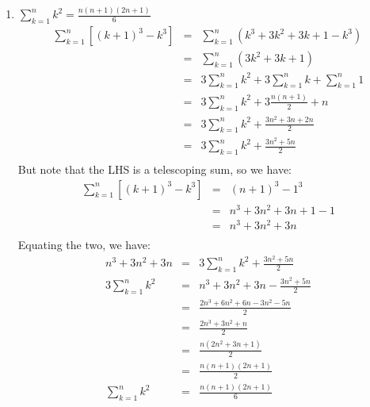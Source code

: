 \documentclass[letterpaper,12pt,fleqn]{article}
\begin{document}
\begin{theproof}
\begin{enumerate}
\item $\sum_{k=1}^nk^2=\frac{n(n+1)(2n+1)}{6}$
\begin{eqnarray*}
\sum_{k=1}^n[(k+1)^3-k^3] &=& \sum_{k=1}^n(k^3+3k^2+3k+1-k^3) \\
    &=& \sum_{k=1}^n(3k^2+3k+1) \\
    &=& 3\sum_{k=1}^nk^2+3\sum_{k=1}^nk+\sum_{k=1}^n1 \\
    &=& 3\sum_{k=1}^nk^2+3\frac{n(n+1)}{2}+n \\
    &=& 3\sum_{k=1}^nk^2+\frac{3n^2+3n+2n}{2} \\
    &=& 3\sum_{k=1}^nk^2+\frac{3n^2+5n}{2} \\
\end{eqnarray*}
But note that the LHS is a telescoping sum, so we have:
\begin{eqnarray*}
\sum_{k=1}^n[(k+1)^3-k^3] &=& (n+1)^3-1^3 \\
    &=& n^3+3n^2+3n+1-1 \\
    &=& n^3+3n^2+3n \\
\end{eqnarray*}
Equating the two, we have:
\begin{eqnarray*}
n^3+3n^2+3n &=& 3\sum_{k=1}^nk^2+\frac{3n^2+5n}{2} \\
3\sum_{k=1}^nk^2 &=& n^3+3n^2+3n-\frac{3n^2+5n}{2} \\
    &=& \frac{2n^3+6n^2+6n-3n^2-5n}{2} \\
    &=& \frac{2n^3+3n^2+n}{2} \\
    &=& \frac{n(2n^2+3n+1)}{2} \\
    &=& \frac{n(n+1)(2n+1)}{2} \\
\sum_{k=1}^nk^2 &=& \frac{n(n+1)(2n+1)}{6} \\
\end{eqnarray*}


\end{enumerate}
\end{theproof}
\end{document}

